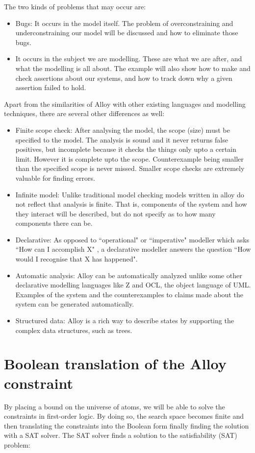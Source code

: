 \documentclass[a4paper,12pt]{extarticle}
\begin{document}
{The two kinds of problems that may occur are:
\begin{itemize}
\item 	Bugs: It occurs in the model itself. The problem of overconstraining and underconstraining our model will be discussed and how to eliminate those bugs.\cite{Palshikar2004}
\item It occurs in the subject we are modelling. These are what we are after, and what the modelling is all about. The example will also show how to make and check assertions about our systems, and how to track down why a given assertion failed to hold.\cite{Palshikar2004} 
\end{itemize}
Apart from the similarities of Alloy with other existing languages and modelling techniques, there are several other differences as well:
\begin{itemize}
\item 	Finite scope check: After analysing the model, the scope (size) must be specified to the model. The analysis is sound and it never returns false positives, but incomplete because it checks the things only upto a certain limit. However it is complete upto the scope. Counterexample being smaller than the specified scope is never missed. Smaller scope checks are extremely valuable for finding errors. 
\item Infinite model: Unlike traditional model checking models written in alloy do not reflect that analysis is finite. That is, components of the system and how they interact will be described, but do not specify as to how many components there can be. 
\item Declarative: As opposed to ``operational" or ``imperative" modeller which asks ``How can I accomplish X" , a declarative modeller answers the question ``How would I recognise that X has happened".
\item 	Automatic analysis: Alloy can be automatically analyzed unlike some other declarative modelling languages like Z and OCL\cite{J.M.Spivey1989}, the object language of UML. Examples of the system and the counterexamples to claims made about the system can be generated automatically.
\item Structured data: Alloy is a rich way to describe states by supporting the complex data structures, such as trees.
\end{itemize}
\section{Boolean translation of the Alloy constraint}
\label{Bool Transl}
\onehalfspacing
By placing a bound on the universe of atoms, we will be able to solve the constraints in first-order logic. By doing so, the search space becomes finite and then translating the constraints into the Boolean form finally finding the solution with a SAT solver\cite{Strichman}. The SAT solver finds a solution to the satisfiability (SAT) problem: 

}
\end{document}
